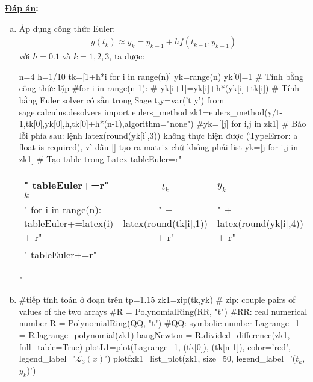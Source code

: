 \documentclass[12pt]{article}
\newcommand{\Solution}{
\medskip
{\bf \underline{Đáp án}:}
}
\begin{document}
\Solution
\begin{enumerate}[a).]
\item Áp dụng công thức Euler:
\begin{align*}
 y(t_k) \approx y_k = y_{k-1} + h f(t_{k-1},y_{k-1})
\end{align*}
với $h=0.1$ và $k=1, 2, 3$, ta được:
\begin{sagesilent}
 n=4
 h=1/10
 tk=[1+h*i for i in range(n)]
 yk=range(n)
 yk[0]=1
 # Tính bằng công thức lặp
 #for i in range(n-1):
 #  yk[i+1]=yk[i]+h*(yk[i]+tk[i])
 # Tính bằng Euler solver có sẵn trong Sage
 t,y=var('t y')
 from sage.calculus.desolvers import eulers_method
 zk1=eulers_method(y/t-1,tk[0],yk[0],h,tk[0]+h*(n-1),algorithm="none")
 #yk=[[j] for i,j in zk1] # Báo lỗi phía sau: lệnh latex(round(yk[i],3)) không thực hiện được (TypeError: a float is required), vì dấu [] tạo ra matrix chứ không phải list
 yk=[j for i,j in zk1]
 # Tạo table trong Latex
 tableEuler=r"\begin{tabular}{l|c|l}"
 tableEuler+=r"$k$ & $t_k$ & $y_k$ \\ \hline"
 for i in range(n):
   tableEuler+=latex(i) + r"&" + latex(round(tk[i],1)) + r"&" + latex(round(yk[i],4)) + r"\\"
 tableEuler+=r"\end{tabular}"
\end{sagesilent}

  \begin{center}  \end{center} 

\item
\begin{sagesilent}
 #tiếp tính toán ở đoạn trên
 tp=1.15
 zk1=zip(tk,yk) # zip: couple pairs of values of the two arrays
 #R = PolynomialRing(RR, "t") #RR: real numerical number
 R = PolynomialRing(QQ, "t") #QQ: symbolic number
 Lagrange_1 = R.lagrange_polynomial(zk1)
 bangNewton = R.divided_difference(zk1, full_table=True)
 plotL1=plot(Lagrange_1, (tk[0]), (tk[n-1]), color='red', legend_label='$\mathcal{L}_3(x)$')
 plotfxk1=list_plot(zk1, size=50, legend_label='($t_k$,$y_k$)')


\end{sagesilent}
\end{enumerate}
\end{document}
